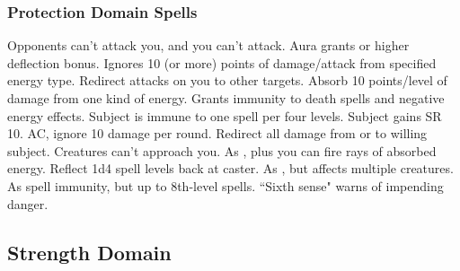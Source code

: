 \subsubsection{Protection Domain Spells}
\begin{spelllist}
   Opponents can't attack you, and you can't attack.
   Aura grants  or higher deflection bonus.
   Ignores 10 (or more) points of damage/attack from specified energy type.
  \spellhead[2]{}
   Redirect attacks on you to other targets.
   Absorb 10 points/level of damage from one kind of energy.
   Grants immunity to death spells and negative energy effects.
   Subject is immune to one spell per four levels.
   Subject gains SR 10.
    AC, ignore 10 damage per round.
   Redirect all damage from or to willing subject.
   Creatures can't approach you.
   As , plus you can fire rays of absorbed energy.
   Reflect 1d4 spell levels back at caster.
   As , but affects multiple creatures.
   As spell immunity, but up to 8th-level spells.
   ``Sixth sense" warns of impending danger.
  \spellhead[9]{}
\end{spelllist}

\subsection{Strength Domain}

